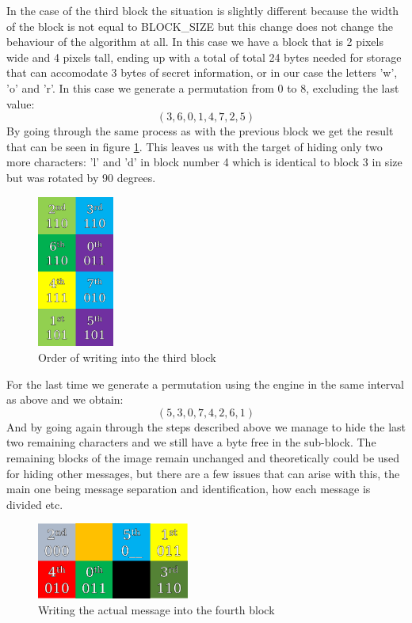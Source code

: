 \begin{multicols*}{2}
In the case of the third block the situation is slightly different because the width of the block is not equal to BLOCK\_SIZE but this change does not change the behaviour of the algorithm at all. In this case we have a block that is 2 pixels wide and 4 pixels tall, ending up with a total of total 24 bytes needed for storage that can accomodate 3 bytes of secret information, or in our case the letters 'w', 'o' and 'r'. In this case we generate a permutation from 0 to 8, excluding the last value:
\[(3,6,0,1,4,7,2,5)\]
By going through the same process as with the previous block we get the result that can be seen in figure \ref{scramble_example_third_block}. This leaves us with the target of hiding only two more characters: 'l' and 'd' in block number 4 which is identical to block 3 in size but was rotated by 90 degrees. 

\begin{figure}[H]
    \centering
    \includegraphics[height=5cm,keepaspectratio]{pics/bmp_scrambling/third_block_marked}
    \caption{Order of writing into the third block}
    \label{scramble_example_third_block}
\end{figure}

For the last time we generate a permutation using the engine in the same interval as above and we obtain:
\[(5,3,0,7,4,2,6,1)\]
And by going again through the steps described above we manage to hide the last two remaining characters and we still have a byte free in the sub-block. The remaining blocks of the image remain unchanged and theoretically could be used for hiding other messages, but there are a few issues that can arise with this, the main one being message separation and identification, how each message is divided etc.

\begin{figure}[H]
    \centering
    \includegraphics[width=5cm,keepaspectratio]{pics/bmp_scrambling/fourth_block_marked}
    \caption{Writing the actual message into the fourth block}
\end{figure}


\end{multicols*}
